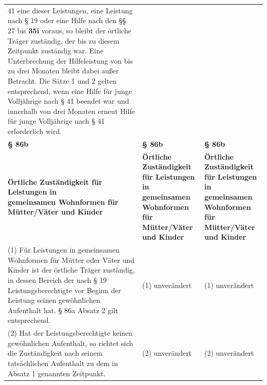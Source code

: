 \documentclass[10pt,a4paper,landscape]{article}
\begin{document}
\begin{longtable}{|L{8.2cm}|L{8.2cm}|L{8.2cm}|}
41 eine dieser Leistungen, eine Leistung  \newline nach \S{} 19 oder eine Hilfe nach den \S{}\S{} 27  \newline bis \textbf{35i} voraus, so bleibt der örtliche Träger  \newline zuständig, der bis zu diesem Zeitpunkt  \newline zuständig war. Eine Unterbrechung der  \newline Hilfeleistung von bis zu drei Monaten bleibt  \newline dabei außer Betracht. Die Sätze 1 und 2  \newline gelten entsprechend, wenn eine Hilfe für  \newline junge Volljährige nach \S{} 41 beendet war  \newline und innerhalb von drei Monaten erneut  \newline Hilfe für junge Volljährige nach \S{} 41  \newline erforderlich wird. \\
\hhline{|---|}
\textbf{\S{} 86b} & \textbf{\S{} 86b} & \textbf{\S{} 86b} \\
\hhline{|---|}
\textbf{Örtliche Zuständigkeit für Leistungen in  \newline gemeinsamen Wohnformen für  \newline Mütter/Väter und Kinder} & \textbf{Örtliche Zuständigkeit für Leistungen in  \newline gemeinsamen Wohnformen für  \newline Mütter/Väter und Kinder} & \textbf{Örtliche Zuständigkeit für Leistungen in  \newline gemeinsamen Wohnformen für  \newline Mütter/Väter und Kinder} \\
\hhline{|---|}
(1) Für Leistungen in gemeinsamen  \newline Wohnformen für Mütter oder Väter und  \newline Kinder ist der örtliche Träger zuständig, in  \newline dessen Bereich der nach \S{} 19  \newline Leistungsberechtigte vor Beginn der  \newline Leistung seinen gewöhnlichen Aufenthalt  \newline hat. \S{} 86a Absatz 2 gilt entsprechend. & (1) unverändert & (1) unverändert \\
\hhline{|---|}
(2) Hat der Leistungsberechtigte keinen  \newline gewöhnlichen Aufenthalt, so richtet sich die  \newline Zuständigkeit nach seinem tatsächlichen  \newline Aufenthalt zu dem in Absatz 1 genannten  \newline Zeitpunkt. & (2) unverändert & (2) unverändert \\

\end{longtable}
\end{document}
